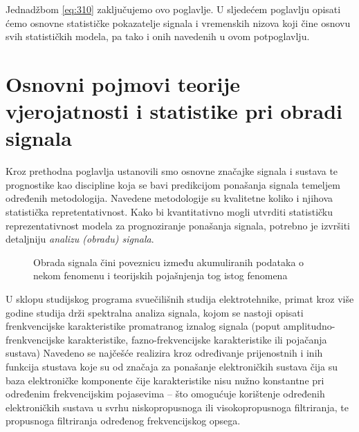 \documentclass[a4paper,12pt,oneside]{memoir}
\begin{document}
                Jednadžbom \ref{eq:310} zaključujemo ovo poglavlje. U sljedećem poglavlju opisati ćemo osnovne statističke pokazatelje signala i vremenskih nizova koji čine osnovu svih statističkih modela, pa tako i onih navedenih u ovom potpoglavlju.        

    \chapter{Osnovni pojmovi teorije vjerojatnosti i statistike pri obradi signala}


        Kroz prethodna poglavlja ustanovili smo osnovne značajke signala i sustava te prognostike kao discipline koja se bavi predikcijom ponašanja signala temeljem određenih metodologija. Navedene metodologije su kvalitetne koliko i njihova statistička repretentativnost. Kako bi kvantitativno mogli utvrditi statističku reprezentativnost modela za prognoziranje ponašanja signala, potrebno je izvršiti detaljniju \textit{analizu (obradu) signala}.

        \begin{figure}[H]
            \centering
            \caption{Obrada signala čini poveznicu između akumuliranih podataka o nekom fenomenu i teorijskih pojašnjenja tog istog fenomena \cite{Broersen}}
            \label{fig:41}
        \end{figure}
        
        U sklopu studijskog programa svuečilišnih studija elektrotehnike, primat kroz više godine studija drži spektralna analiza signala, kojom se nastoji opisati frenkvencijske karakteristike promatranog iznalog signala (poput amplitudno-frenkvencijske karakteristike, fazno-frekvencijske karakteristike ili pojačanja sustava) Navedeno se najčešće realizira kroz određivanje prijenostnih i inih funkcija stustava koje su od značaja za ponašanje elektroničkih sustava čija su baza elektroničke komponente čije karakteristike nisu nužno konstantne pri određenim frekvencijskim pojasevima -- što omogućuje korištenje određenih elektroničkih sustava u svrhu niskopropusnoga ili visokopropusnoga filtriranja, te propusnoga filtriranja određenog frekvencijskog opsega.
\end{document}

